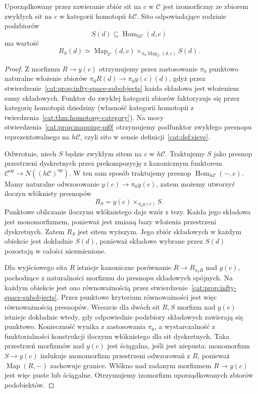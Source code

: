 \begin{stwierdzenie}\label{cat:prop:infty-sieve-homotopy-category}
Uporządkowany przez zawieranie zbiór sit na $c$ w $\mathcal C$ jest izomorficzny ze zbiorem zwykłych sit na $c$ w kategorii homotopii $h\mathcal C$. Sito odpowiadające rodzinie podzbiorów
\[
 S(d)\subseteq\operatorname{Hom}_{h\mathcal C}(d,c)
\]
ma wartość
\[
 R_S(d)\simeq
 \operatorname{Map}_{\mathcal C}(d,c)
 \times_{\pi_0\operatorname{Map}_{\mathcal C}(d,c)}S(d).
\]
\end{stwierdzenie}
\begin{proof}
Z morfizmu $R\to y(c)$ otrzymujemy przez zastosowanie $\pi_0$ punktowo naturalne włożenie zbiorów $\pi_0 R(d)\to\pi_0y(c)(d)$, gdyż przez stwierdzenie~\ref{cat:prop:infty-space-subobjects} każda składowa jest włożeniem sumy składowych. Funktor do zwykłej kategorii zbiorów faktoryzuje się przez kategorię homotopii dziedziny (własność kategorii homotopii z twierdzenia~\ref{cat:thm:homotopy-category}). Na mocy stwierdzenia~\ref{cat:prop:mapping-pi0} otrzymujemy podfunktor zwykłego presnopu reprezentowalnego na $h\mathcal C$, czyli sito w sensie definicji~\ref{cat:def:sieve}.

Odwrotnie, niech $S$ będzie zwykłym sitem na $c$ w $h\mathcal C$. Traktujemy $S$ jako presnop przestrzeni dyskretnych przez prekompozycję z kanonicznym funktorem $\mathcal C^{\mathrm{op}}\to N((h\mathcal C)^{\mathrm{op}})$. W ten sam sposób traktujemy presnop $\operatorname{Hom}_{h\mathcal C}(-,c)$. Mamy naturalne odwzorowanie $y(c)\to\pi_0y(c)$, zatem możemy utworzyć iloczyn włóknisty presnopów
\[
 R_S=y(c)\times_{\pi_0y(c)}S.
\]
Punktowe obliczanie iloczynu włóknistego daje wzór z tezy. Każda jego składowa jest monomorfizmem, ponieważ jest zmianą bazy włożenia przestrzeni dyskretnych. Zatem $R_S$ jest sitem wyższym. Jego zbiór składowych w każdym obiekcie jest dokładnie $S(d)$, ponieważ składowe wybrane przez $S(d)$ pozostają w całości niezmienione.

Dla wyjściowego sita $R$ istnieje kanoniczne porównanie $R\to R_{\pi_0R}$ nad $y(c)$, pochodzące z naturalności morfizmu do presnopu składowych spójnych. Na każdym obiekcie jest ono równoważnością przez stwierdzenie~\ref{cat:prop:infty-space-subobjects}. Przez punktowe kryterium równoważności jest więc równoważnością presnopów. Wreszcie dla dwóch sit $R,S$ morfizm nad $y(c)$ istnieje dokładnie wtedy, gdy odpowiednie podzbiory składowych zawierają się punktowo. Konieczność wynika z zastosowania $\pi_0$, a wystarczalność z funktorialności konstrukcji iloczynu włóknistego dla sit dyskretnych. Taka przestrzeń morfizmów nad $y(c)$ jest ściągalna, jeśli jest niepusta: monomorfizm $S\to y(c)$ indukuje monomorfizm przestrzeni odwzorowań z $R$, ponieważ $\operatorname{Map}(R,-)$ zachowuje granice. Włókno nad zadanym morfizmem $R\to y(c)$ jest więc puste lub ściągalne. Otrzymujemy izomorfizm uporządkowanych zbiorów podobiektów.
\end{proof}

